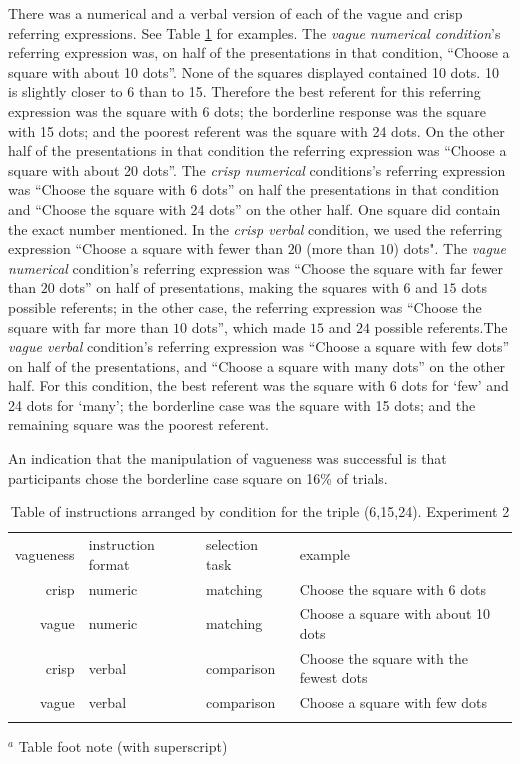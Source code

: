 There was a numerical and a verbal version of each of the vague and crisp referring expressions. See Table \ref{instructionse2} for examples.
The {\em vague numerical condition}'s referring expression was, on half of the presentations in that condition, ``Choose a square with about 10 dots''. None of the squares displayed contained 10 dots. 10 is slightly closer to 6 than to 15. Therefore the best referent for this referring expression was the square with 6 dots;  the borderline response was the square with 15 dots; and the poorest referent was the square with 24 dots. On the other half of the presentations in that condition the referring expression was ``Choose a square with about 20 dots''. The {\em crisp numerical} conditions's referring expression was ``Choose the square with 6 dots'' on half the presentations in that condition and ``Choose the square with 24 dots'' on the other half. One square did contain the exact number mentioned.  In the {\em crisp verbal} condition, we used the referring expression ``Choose a square with fewer than $20$ (more than $10$) dots".  The {\em vague numerical} condition's referring expression was ``Choose the square with far fewer than $20$ dots'' on half of presentations, making the squares with 6 and $15$ dots possible referents; in the other case, the referring expression was ``Choose the square with far more than $10$ dots'', which made $15$ and $24$ possible referents.The {\em vague verbal} condition's referring expression was ``Choose a square with few dots'' on half of the presentations, and ``Choose a square with many dots'' on the other half. For this condition, the best referent was the square with 6 dots for `few' and 24 dots for `many'; the borderline case was the square with 15 dots; and the remaining square was the poorest referent. 

An indication that the manipulation of vagueness was successful is that participants chose the borderline case square on 16\% of trials.

\begin{table}
\caption{Table of instructions arranged by condition for the triple (6,15,24). Experiment 2}
\label{instructionse2} 
\begin{tabular}{rlll}
\hline\noalign{\smallskip}
vagueness&instruction format&selection task&example\\
\noalign{\smallskip}\svhline\noalign{\smallskip}
crisp 	& 	numeric	& matching	&Choose the square with 6 dots \\
vague	&	numeric & matching	&Choose a square with about 10 dots\\
crisp	&	verbal	& comparison	&Choose the square with the fewest dots\\
vague	&	verbal	& comparison	&Choose a square with few dots\\
\noalign{\smallskip}\hline\noalign{\smallskip}
\end{tabular}
$^a$ Table foot note (with superscript)\\
\end{table}



